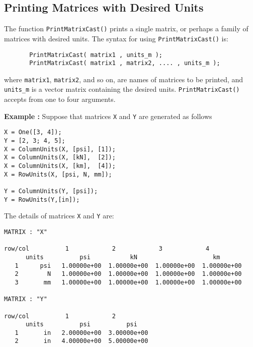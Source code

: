 \subsection{Printing Matrices with Desired Units}  

\vspace{0.15 in}
\noindent\hspace{0.50 in}
The function {\tt PrintMatrixCast()} prints a single matrix,
or perhaps a family of matrices with desired units.
The syntax for using {\tt PrintMatrixCast()} is:

\begin{footnotesize}
\begin{verbatim}
       PrintMatrixCast( matrix1 , units_m );
       PrintMatrixCast( matrix1 , matrix2, .... , units_m );
\end{verbatim}
\end{footnotesize}

\vspace{0.15 in}\noindent
where {\tt matrix1}, {\tt matrix2}, and so on,
are names of matrices to be printed,
and {\tt units\_m} is a vector matrix containing the desired units.
{\tt PrintMatrixCast()} accepts from one to four arguments.

\vspace{0.15 in}\noindent
{\bf Example :} Suppose that matrices {\tt X} and {\tt Y}
are generated as follows

\begin{footnotesize}
\begin{verbatim}
X = One([3, 4]);
Y = [2, 3; 4, 5];
X = ColumnUnits(X, [psi], [1]);
X = ColumnUnits(X, [kN],  [2]);
X = ColumnUnits(X, [km],  [4]);
X = RowUnits(X, [psi, N, mm]);

Y = ColumnUnits(Y, [psi]);
Y = RowUnits(Y,[in]);
\end{verbatim}
\end{footnotesize}

\vspace{0.15 in}\noindent
The details of matrices {\tt X} and {\tt Y} are:

\begin{footnotesize}
\begin{verbatim}
MATRIX : "X"

row/col          1            2            3            4          
      units          psi           kN                     km   
   1      psi   1.00000e+00  1.00000e+00  1.00000e+00  1.00000e+00
   2        N   1.00000e+00  1.00000e+00  1.00000e+00  1.00000e+00
   3       mm   1.00000e+00  1.00000e+00  1.00000e+00  1.00000e+00

MATRIX : "Y"

row/col          1            2          
      units          psi          psi   
   1       in   2.00000e+00  3.00000e+00
   2       in   4.00000e+00  5.00000e+00

\end{verbatim}
\end{footnotesize}

